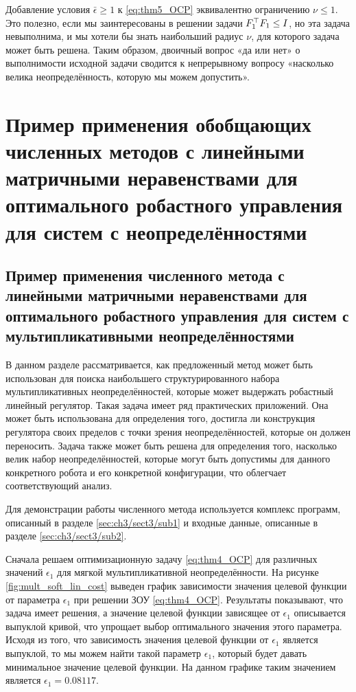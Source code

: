 \begin{remark}
	\label{rm:nu_trick}
	Добавление условия $\bar{\epsilon}\geq 1$ к \eqref{eq:thm5_OCP} эквивалентно ограничению $\nu \leq 1$. Это полезно, если мы заинтересованы в решении задачи ${F}_1^\top{F}_1 \leq {I}$, но эта задача невыполнима, и мы хотели бы знать наибольший радиус $\nu$, для которого задача может быть решена. Таким образом, двоичный вопрос «да или нет» о выполнимости исходной задачи сводится к непрерывному вопросу «насколько велика неопределённость, которую мы можем допустить».
\end{remark}

\section{Пример применения обобщающих численных методов с линейными матричными неравенствами для оптимального робастного управления для систем с неопределённостями}\label{sec:ch4/sect3}

\subsection{Пример применения численного метода с линейными матричными неравенствами для оптимального робастного управления для систем с мультипликативными неопределённостями}\label{sec:ch4/sect3/sub1}

В данном разделе рассматривается, как предложенный метод может быть использован для поиска наибольшего структурированного набора мультипликативных неопределённостей, которые может выдержать робастный линейный регулятор. Такая задача имеет ряд практических приложений. Она может быть использована для определения того, достигла ли конструкция регулятора своих пределов с точки зрения неопределённостей, которые он должен переносить. Задача также может быть решена для определения того, насколько велик набор неопределённостей, которые могут быть допустимы для данного конкретного робота и его конкретной конфигурации, что облегчает соответствующий анализ.

Для демонстрации работы численного метода используется комплекс программ, описанный в разделе \ref{sec:ch3/sect3/sub1} и входные данные, описанные в разделе \ref{sec:ch3/sect3/sub2}.

Сначала решаем оптимизационную задачу \eqref{eq:thm4_OCP} для различных значений $\epsilon_1$ для мягкой мультипликативной неопределённости. 
На рисунке \ref{fig:mult_soft_lin_cost} выведен график зависимости значения целевой функции от параметра $\epsilon_1$ при решении ЗОУ \eqref{eq:thm4_OCP}. Результаты показывают, что задача имеет решения, а значение целевой функции зависящее от $\epsilon_1$ описывается выпуклой кривой, что упрощает выбор оптимального значения этого параметра. Исходя из того, что зависимость значения целевой функции от $\epsilon_1$ является выпуклой, то мы можем найти такой параметр $\epsilon_1$, который будет давать минимальное значение целевой функции. На данном графике таким значением является $\epsilon_1 = 0.08117$.

